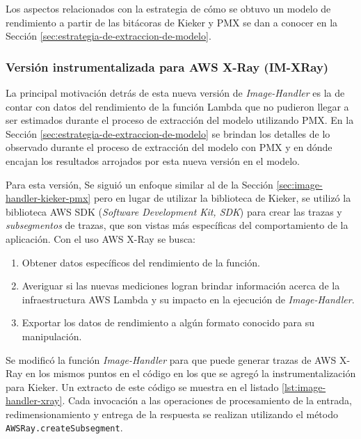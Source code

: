 Los aspectos relacionados con la estrategia de cómo se obtuvo un modelo de rendimiento a partir de las bitácoras de Kieker y PMX se dan a conocer en la Sección \ref{sec:estrategia-de-extraccion-de-modelo}.

\subsubsection{Versión instrumentalizada para AWS X-Ray (IM-XRay)}
La principal motivación detrás de esta nueva versión de \emph{Image-Handler} es la de contar con datos del rendimiento de la función Lambda que no pudieron llegar a ser estimados durante el proceso de extracción del modelo utilizando PMX. En la Sección \ref{sec:estrategia-de-extraccion-de-modelo} se brindan los detalles de lo observado durante el proceso de extracción del modelo con PMX y en dónde encajan los resultados arrojados por esta nueva versión en el modelo.
 
Para esta versión, Se siguió un enfoque similar al de la Sección \ref{sec:image-handler-kieker-pmx} pero en lugar de utilizar la biblioteca de Kieker, se utilizó la biblioteca AWS SDK (\emph{Software Development Kit, SDK}) para crear las trazas y \emph{subsegmentos} de trazas, que son vistas más específicas del comportamiento de la aplicación. Con el uso AWS X-Ray se busca: 
\begin{enumerate}
    \item Obtener datos específicos del rendimiento de la función.
    \item Averiguar si las nuevas mediciones logran brindar información acerca de la infraestructura AWS Lambda y su impacto en la ejecución de \emph{Image-Handler}.
    \item Exportar los datos de rendimiento a algún formato conocido para su manipulación.
\end{enumerate}

Se modificó la función \emph{Image-Handler} para que puede generar trazas de AWS X-Ray en los mismos puntos en el código en los que se agregó la instrumentalización para Kieker. Un extracto de este código se muestra en el listado \ref{lst:image-handler-xray}. Cada invocación a las operaciones de procesamiento de la entrada, redimensionamiento y entrega de la respuesta se realizan utilizando el método \texttt{AWSRay.createSubsegment}.

